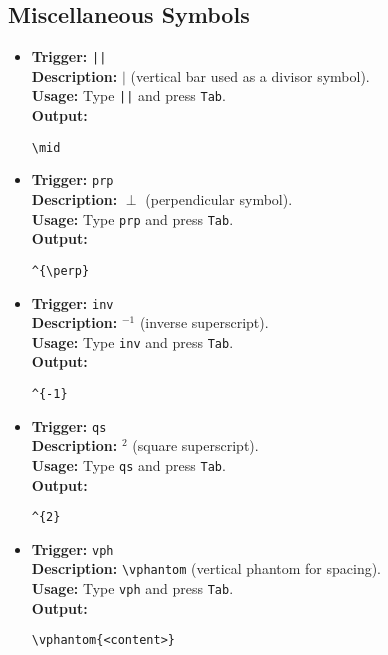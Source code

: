 \documentclass{article}
\begin{document}
\subsection{Miscellaneous Symbols}
\begin{itemize}[leftmargin=*, label={}]
\item \textbf{Trigger:} \texttt{||} \\
\textbf{Description:} \(\mid\) (vertical bar used as a divisor symbol). \\
\textbf{Usage:} Type \texttt{||} and press \texttt{Tab}. \\
\textbf{Output:}
\begin{verbatim}
\mid 
\end{verbatim}

\item \textbf{Trigger:} \texttt{prp} \\
\textbf{Description:} \(\perp\) (perpendicular symbol). \\
\textbf{Usage:} Type \texttt{prp} and press \texttt{Tab}. \\
\textbf{Output:}
\begin{verbatim}
^{\perp}
\end{verbatim}

\item \textbf{Trigger:} \texttt{inv} \\
\textbf{Description:} \(^{-1}\) (inverse superscript). \\
\textbf{Usage:} Type \texttt{inv} and press \texttt{Tab}. \\
\textbf{Output:}
\begin{verbatim}
^{-1}
\end{verbatim}

\item \textbf{Trigger:} \texttt{qs} \\
\textbf{Description:} \(^{2}\) (square superscript). \\
\textbf{Usage:} Type \texttt{qs} and press \texttt{Tab}. \\
\textbf{Output:}
\begin{verbatim}
^{2}
\end{verbatim}

\item \textbf{Trigger:} \texttt{vph} \\
\textbf{Description:} \verb|\vphantom| (vertical phantom for spacing). \\
\textbf{Usage:} Type \texttt{vph} and press \texttt{Tab}. \\
\textbf{Output:}
\begin{verbatim}
\vphantom{<content>}
\end{verbatim}


\end{itemize}
\end{document}
